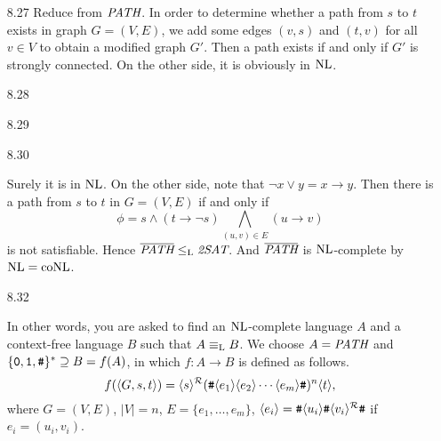 \begin{itemize}
	\item[8.27]
	Reduce from $\textit{PATH}$. In order to determine whether a path from $s$ to $t$ exists in graph $G = (V, E)$, we add some edges $(v, s)$ and $(t, v)$ for all $v \in V$ to obtain a modified graph $G'$. Then a path exists if and only if $G'$ is strongly connected. On the other side, it is obviously in $\textrm{NL}$.
	
	\item[8.28]
	\Empty
	
	\item[8.29]
	\Empty
	
	\item[8.30]
	\Empty
		
	\item[\Star 8.31]
	Surely it is in $\textrm{NL}$. On the other side, note that $\neg x \vee y = x \to y$. Then there is a path from $s$ to $t$ in $G = (V, E)$ if and only if
	$$
		\phi = s \wedge (t \to \neg s) \bigwedge_{(u, v) \in E} (u \to v)
	$$
	is not satisfiable. Hence $\overline{\textit{PATH}} \leq_{\textrm{L}} \textit{2SAT}$. And $\overline{\textit{PATH}}$ is $\textrm{NL}$-complete by $\textrm{NL} = \textrm{coNL}$.
	
	\item[8.32]
	\Empty
	
	\item[\Star 8.33] 
	In other words, you are asked to find an $\textrm{NL}$-complete language $A$ and a context-free language $B$ such that $A \equiv_{\textrm{L}} B$. We choose $A = \textit{PATH}$ and $\{\texttt{0}, \texttt{1}, \texttt{\#}\}^* \supseteq B = f(A)$, in which $f: A \to B$ is defined as follows.
	$$
		f(\langle {G, s, t} \rangle) = \langle {s} \rangle^{\mathcal{R}}(\texttt{\#} \langle {e_1} \rangle \langle {e_2} \rangle \cdots \langle {e_m} \rangle \texttt{\#} )^n\langle {t} \rangle,
	$$
	where $G = (V, E)$, $|V| = n$, $E = \{e_1, \dots, e_m\}$, $\langle {e_i} \rangle = \texttt{\#} \langle {u_i} \rangle\texttt{\#}\langle {v_i} \rangle^{\mathcal{R}}\texttt{\#}$ if $e_i = (u_i, v_i)$.
	
	\item[\Star 8.34] 
	\Omit
	
\end{itemize}